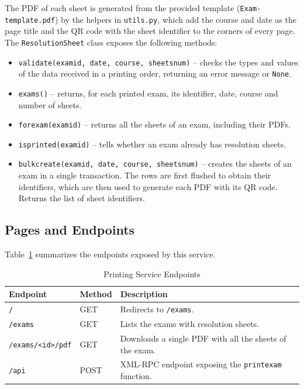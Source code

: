 \documentclass[letterpaper, 10 pt, conference]{ieeeconf}
\renewcommand{\_}{\textunderscore\allowbreak}
\begin{document}
The PDF of each sheet is generated from the provided template (\texttt{Exam-template.pdf}) by the helpers in \texttt{utils.py}, which add the course and date as the page title and the QR code with the sheet identifier to the corners of every page. The \texttt{ResolutionSheet} class exposes the following methods:
\begin{itemize}
    \item \texttt{validate(exam\_id, date, course, sheets\_num)} -- checks the types and values of the data received in a printing order, returning an error message or \texttt{None}.
    \item \texttt{exams()} -- returns, for each printed exam, its identifier, date, course and number of sheets.
    \item \texttt{for\_exam(exam\_id)} -- returns all the sheets of an exam, including their PDFs.
    \item \texttt{is\_printed(exam\_id)} -- tells whether an exam already has resolution sheets.
    \item \texttt{bulk\_create(exam\_id, date, course, sheets\_num)} -- creates the sheets of an exam in a single transaction. The rows are first flushed to obtain their identifiers, which are then used to generate each PDF with its QR code. Returns the list of sheet identifiers.
\end{itemize}

\subsection{Pages and Endpoints}

Table~\ref{tab:printing-endpoints} summarizes the endpoints exposed by this service.

\begin{table}[H]
    \centering
    \footnotesize
    \caption{Printing Service Endpoints}
    \label{tab:printing-endpoints}
    \begin{tabular}{|p{2.6cm}|p{0.8cm}|p{3.9cm}|}
        \hline
        \textbf{Endpoint} & \textbf{Method} & \textbf{Description} \\ \hline
        \texttt{/} & GET & Redirects to \texttt{/exams}. \\ \hline
        \texttt{/exams} & GET & Lists the exams with resolution sheets. \\ \hline
        \texttt{/exams/<id>/pdf} & GET & Downloads a single PDF with all the sheets of the exam. \\ \hline
        \texttt{/api} & POST & XML-RPC endpoint exposing the \texttt{print\_exam} function. \\ \hline
    \end{tabular}
\end{table}
\end{document}
